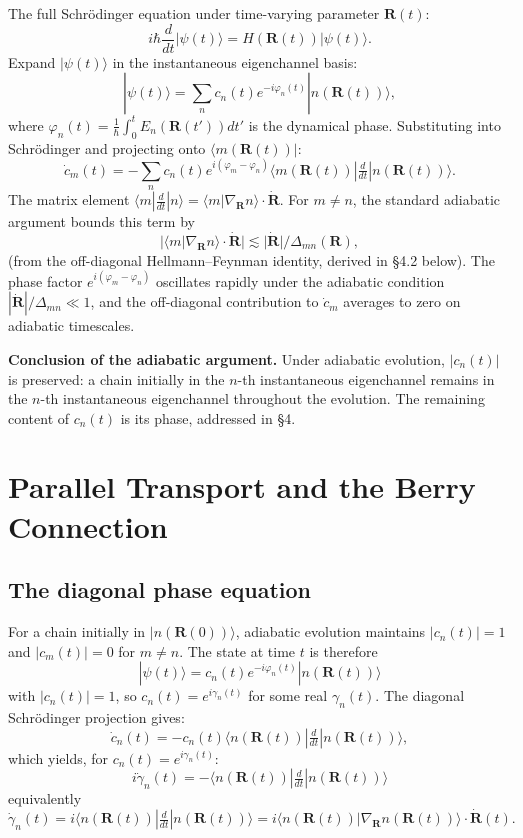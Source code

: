 \documentclass[11pt,a4paper]{article}
\begin{document}
The full Schr\"odinger equation under time-varying parameter $\mathbf{R}(t)$:
\[
i\hbar \frac{d}{dt} |\psi(t)\rangle = H(\mathbf{R}(t)) |\psi(t)\rangle.
\]
Expand $|\psi(t)\rangle$ in the instantaneous eigenchannel basis:
\[
|\psi(t)\rangle = \sum_n c_n(t) e^{-i\varphi_n(t)} |n(\mathbf{R}(t))\rangle,
\]
where $\varphi_n(t) = \frac{1}{\hbar}\int_0^t E_n(\mathbf{R}(t'))dt'$ is the dynamical phase. Substituting into Schr\"odinger and projecting onto $\langle m(\mathbf{R}(t))|$:
\[
\dot c_m(t) = -\sum_n c_n(t) e^{i(\varphi_m - \varphi_n)} \langle m(\mathbf{R}(t))|\tfrac{d}{dt}|n(\mathbf{R}(t))\rangle.
\]
The matrix element $\langle m|\tfrac{d}{dt}|n\rangle = \langle m|\nabla_\mathbf{R} n\rangle\cdot\dot{\mathbf{R}}$. For $m \neq n$, the standard adiabatic argument bounds this term by
\[
|\langle m|\nabla_\mathbf{R} n\rangle \cdot \dot{\mathbf{R}}| \lesssim |\dot{\mathbf{R}}| / \Delta_{mn}(\mathbf{R}),
\]
(from the off-diagonal Hellmann--Feynman identity, derived in \S4.2 below). The phase factor $e^{i(\varphi_m - \varphi_n)}$ oscillates rapidly under the adiabatic condition $|\dot{\mathbf{R}}|/\Delta_{mn} \ll 1$, and the off-diagonal contribution to $\dot c_m$ averages to zero on adiabatic timescales.

\textbf{Conclusion of the adiabatic argument.} Under adiabatic evolution, $|c_n(t)|$ is preserved: a chain initially in the $n$-th instantaneous eigenchannel remains in the $n$-th instantaneous eigenchannel throughout the evolution. The remaining content of $c_n(t)$ is its phase, addressed in \S4.

\section{Parallel Transport and the Berry Connection}

\subsection{The diagonal phase equation}

For a chain initially in $|n(\mathbf{R}(0))\rangle$, adiabatic evolution maintains $|c_n(t)| = 1$ and $|c_m(t)| = 0$ for $m \neq n$. The state at time $t$ is therefore
\[
|\psi(t)\rangle = c_n(t) e^{-i\varphi_n(t)} |n(\mathbf{R}(t))\rangle
\]
with $|c_n(t)| = 1$, so $c_n(t) = e^{i\gamma_n(t)}$ for some real $\gamma_n(t)$. The diagonal Schr\"odinger projection gives:
\[
\dot c_n(t) = -c_n(t) \langle n(\mathbf{R}(t))|\tfrac{d}{dt}|n(\mathbf{R}(t))\rangle,
\]
which yields, for $c_n(t) = e^{i\gamma_n(t)}$:
\[
i \dot\gamma_n(t) = -\langle n(\mathbf{R}(t))|\tfrac{d}{dt}|n(\mathbf{R}(t))\rangle
\]
equivalently
\[
\dot\gamma_n(t) = i \langle n(\mathbf{R}(t))| \tfrac{d}{dt} |n(\mathbf{R}(t))\rangle
= i \langle n(\mathbf{R}(t))|\nabla_\mathbf{R} n(\mathbf{R}(t))\rangle \cdot \dot{\mathbf{R}}(t).
\]
\end{document}
